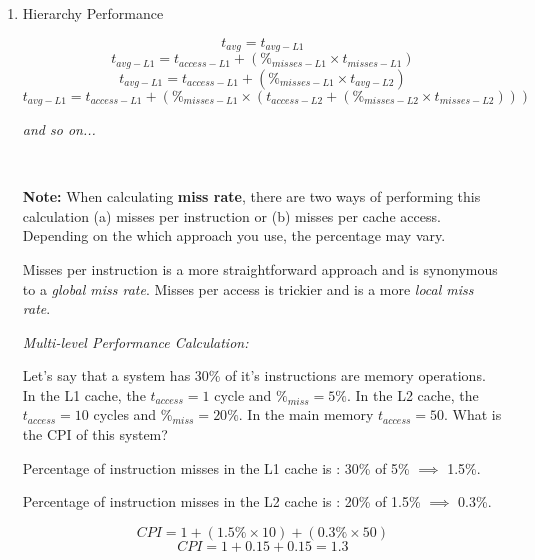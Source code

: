 \documentclass[12pt]{article}
\newenvironment{QandA}{\begin{enumerate}[label=\bfseries\arabic*.]\bfseries}
                      {\end{enumerate}}
\newenvironment{answered}{\par\quad\normalfont}{}
\begin{document}
\begin{QandA}
\begin{answered}
\textit{Design Choice \#2:} \textbf{Inclusive} Memory or \textbf{Exclusive} Memory. In an \textit{Inclusive} design, a block in L1 is always in L2. In an \textit{Exclusive} design, a block is either in L1 or L2, never in both.
\end{answered}

\ 

\item Hierarchy Performance
\begin{answered}
\begin{equation*}
    t_{avg} = t_{avg-L1}
\end{equation*}
\begin{equation*}
    t_{avg-L1} = t_{access-L1} + (\%_{misses-L1} \times t_{misses-L1})
\end{equation*}
\begin{equation*}
    t_{avg-L1} = t_{access-L1} + (\%_{misses-L1} \times t_{avg-L2})
\end{equation*}
\begin{equation*}
    t_{avg-L1} = t_{access-L1} + (\%_{misses-L1} \times (t_{access-L2} + (\%_{misses-L2} \times t_{misses-L2})))
\end{equation*}

\textit{and so on...}

\ 

\textbf{Note:} When calculating \textbf{miss rate}, there are two ways of performing this calculation (a) misses per instruction or (b) misses per cache access. Depending on the which approach you use, the percentage may vary. 

Misses per instruction is a more straightforward approach and is synonymous to a \textit{global miss rate}. Misses per access is trickier and is a more \textit{local miss rate}. 

\newpage 

\textit{Multi-level Performance Calculation:}

Let's say that a system has 30\% of it's instructions are memory operations. In the L1 cache, the $t_{access}=1$ cycle and $\%_{miss}=5\%$. In the L2 cache, the $t_{access}=10$ cycles and $\%_{miss}=20\%$. In the main memory $t_{access}=50$. What is the CPI of this system?

Percentage of instruction misses in the L1 cache is : 30\% of 5\% $\implies$ 1.5\%.

Percentage of instruction misses in the L2 cache is : 20\% of 1.5\% $\implies$ 0.3\%.

\begin{equation*}
    CPI = 1 + (1.5\% \times 10) + (0.3\% \times 50)
\end{equation*}
\begin{equation*}
    CPI = 1 + 0.15 + 0.15 = 1.3
\end{equation*}

\end{answered}

\end{QandA}
\end{document}
